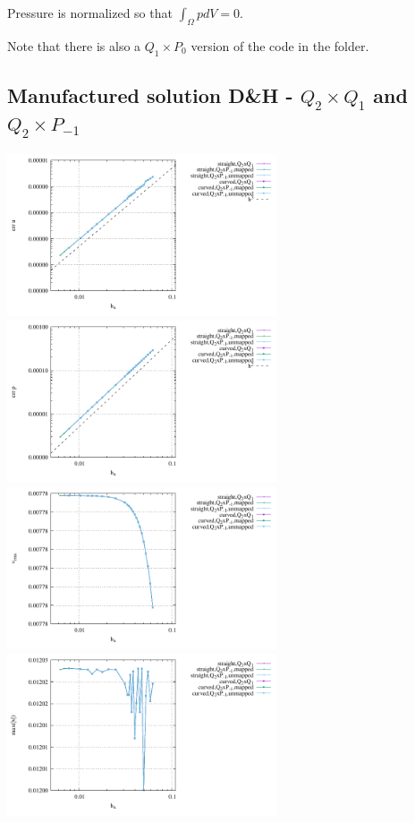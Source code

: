 Pressure is normalized so that $\int_\Omega p dV= 0$.

Note that there is also a $Q_1\times P_0$ version of the code in the folder.

\newpage
\subsection*{Manufactured solution D\&H - $Q_2\times Q_1$ and $Q_2\times P_{-1}$}

\begin{center}
\includegraphics[width=8cm]{python_codes/fieldstone_25/results/doneahuerta/errv.pdf}
\includegraphics[width=8cm]{python_codes/fieldstone_25/results/doneahuerta/errp.pdf}\\
\includegraphics[width=8cm]{python_codes/fieldstone_25/results/doneahuerta/vrms.pdf}
\includegraphics[width=8cm]{python_codes/fieldstone_25/results/doneahuerta/max_vel.pdf}\\

\end{center}

